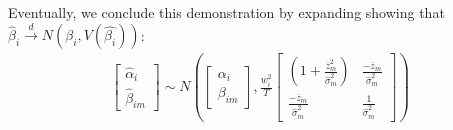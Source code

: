 \documentclass[]{article}
\begin{document}
Eventually, we conclude this demonstration by expanding showing that $\hat{\beta}_i \overset{d}{\to} N(\beta_i,V(\hat{\beta_i}))$:
\begin{align}
	\begin{bmatrix} \hat{\alpha}_i \\ \hat{\beta}_{im} \end{bmatrix}
	\sim N(\begin{bmatrix} \alpha_i \\ \beta_{im} \end{bmatrix}, \frac{w_i^2}{T}\begin{bmatrix} (1 + \frac{\overline{z}_m^2}{\hat{\sigma}_{m}^2}) & \frac{-\overline{z}_m}{\hat{\sigma}_{m}^2} \\ \frac{-\overline{z}_m}{\hat{\sigma}_{m}^2} & \frac{1}{\hat{\sigma}_{m}^2} \end{bmatrix}) 
\end{align}
\end{document}
